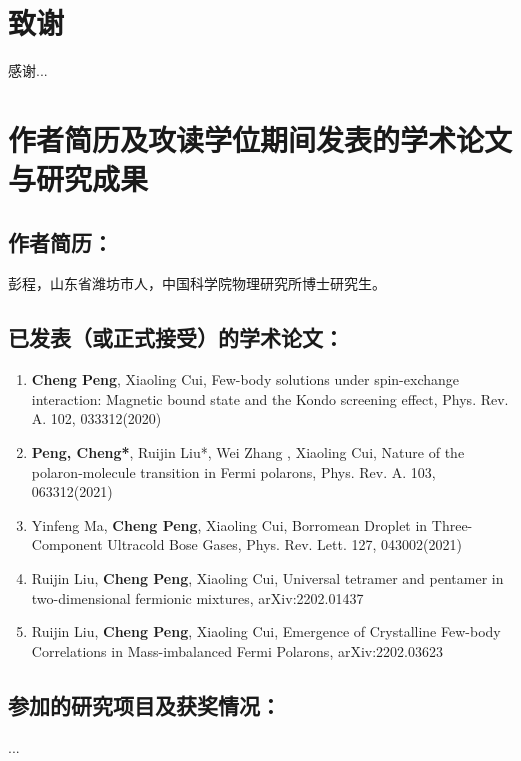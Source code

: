 \chapter[致谢]{致\quad 谢}%

感谢...

\chapter{作者简历及攻读学位期间发表的学术论文与研究成果}


\section*{作者简历：}

彭程，山东省潍坊市人，中国科学院物理研究所博士研究生。

\section*{已发表（或正式接受）的学术论文：}

{
\setlist[enumerate]{}%

\begin{enumerate}[nosep]
    \item {\bfseries\sffamily Cheng Peng}, Xiaoling Cui, Few-body solutions under spin-exchange interaction: Magnetic bound state and the Kondo screening effect, Phys. Rev. A. 102, 033312(2020)
    
    \item {\bfseries\sffamily Peng, Cheng*}, Ruijin Liu*, Wei Zhang , Xiaoling Cui, Nature of the polaron-molecule transition in Fermi polarons, Phys. Rev. A. 103, 063312(2021)

    \item Yinfeng Ma, {\bfseries\sffamily Cheng Peng}, Xiaoling Cui, Borromean Droplet in Three-Component Ultracold Bose Gases, Phys. Rev. Lett. 127, 043002(2021)

    \item Ruijin Liu, {\bfseries\sffamily Cheng Peng}, Xiaoling Cui, Universal tetramer and pentamer in two-dimensional fermionic mixtures, arXiv:2202.01437

    \item Ruijin Liu, {\bfseries\sffamily Cheng Peng}, Xiaoling Cui, Emergence of Crystalline Few-body Correlations in Mass-imbalanced Fermi Polarons, arXiv:2202.03623

\end{enumerate}
}


\section*{参加的研究项目及获奖情况：}
...

\cleardoublepage[plain]%

